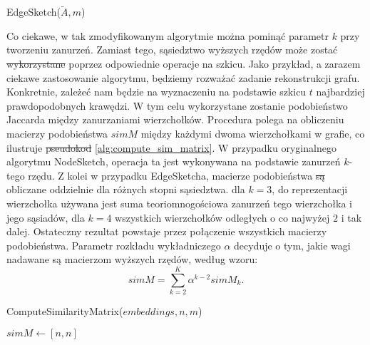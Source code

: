     \begin{algorithm}
        \caption{EdgeSketch($\tilde{A},m$)}\label{alg:edge_sketch}
    \end{algorithm}

    Co ciekawe, w tak zmodyfikowanym algorytmie można pominąć parametr $k$ przy tworzeniu zanurzeń. Zamiast tego, sąsiedztwo wyższych rzędów może zostać \sout{wykorzystane}  poprzez odpowiednie operacje na szkicu. Jako przykład, a zarazem ciekawe zastosowanie algorytmu, będziemy rozważać zadanie rekonstrukcji grafu. Konkretnie, zależeć nam będzie na wyznaczeniu na podstawie szkicu $t$ najbardziej prawdopodobnych krawędzi. W tym celu wykorzystane zostanie podobieństwo Jaccarda między zanurzaniami wierzchołków. Procedura polega na obliczeniu macierzy podobieństwa $simM$ między każdymi dwoma wierzchołkami w grafie, co ilustruje \sout{pseudokod}  \ref{alg:compute_sim_matrix}. W przypadku oryginalnego algorytmu NodeSketch, operacja ta jest wykonywana na podstawie zanurzeń $k$-tego rzędu. Z kolei w przypadku EdgeSketcha, macierze podobieństwa \sout{są}  obliczane oddzielnie dla różnych stopni sąsiedztwa.  dla $k = 3$, do reprezentacji wierzchołka używana jest suma teoriomnogościowa zanurzeń tego wierzchołka i jego sąsiadów, dla $k = 4$ wszystkich wierzchołków odległych o co najwyżej $2$ i tak dalej. Ostateczny rezultat powstaje przez połączenie wszystkich macierzy podobieństwa. Parametr rozkładu wykładniczego $\alpha$ decyduje o tym, jakie wagi nadawane są macierzom wyższych rzędów, według wzoru:
    \begin{equation}  \label{eq:sim_matrix}  
        simM = \sum\limits_{k = 2}^{K} \alpha^{k-2} simM_{k}.
    \end{equation}
    
    \begin{algorithm}
        \caption{ComputeSimilarityMatrix($embeddings, n, m$)}\label{alg:compute_sim_matrix}
        $simM \gets [n,n]$ 
    \end{algorithm}
